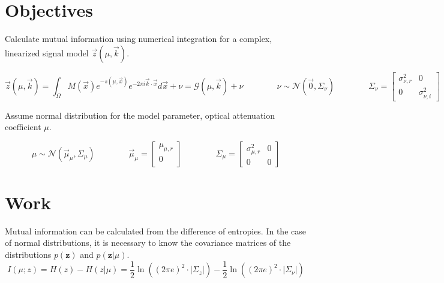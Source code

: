 \documentclass{article}         %
\theoremstyle{definition}
\theoremstyle{remark}
\begin{document}

\section{Objectives}\label{Objectives}

Calculate mutual information using numerical integration for a complex, linearized signal model $\vec{z}\left(\mu,\vec{k}\right)$.

\begin{equation}
	\vec{z}\left(\mu,\vec{k}\right) = \int_\Omega M\left(\vec{x}\right) e^{-s\left(\mu ,\vec{x}\right)}e^{-2\pi i\vec{k}\cdot\vec{x}}d\vec{x}+\nu=\mathcal{G}\left(\mu,\vec{k}\right)+\nu
	\qquad\qquad \nu\sim\mathcal{N}\left(\vec{0},\Sigma_\nu\right)
	\qquad\qquad \Sigma_\nu = \left[ \begin{array}{cc} 
		\sigma_{\nu,r}^2 & 0 \\
		0 & \sigma_{\nu,i}^2 \end{array} \right]
\end{equation}

Assume normal distribution for the model parameter, optical attenuation coefficient $\mu$.

\begin{equation}
	\mu\sim\mathcal{N}\left(\vec{\mu}_\mu,\Sigma_\mu\right)
	\qquad\qquad \vec{\mu}_\mu=\left[ \begin{array}{c}
		\mu_{\mu,r} \\ 0 \\ \end{array} \right]
	\qquad\qquad \Sigma_\mu=\left[\begin{array}{cc}
		\sigma_{\mu,r}^2 & 0 \\
		0 & 0 \end{array} \right]
\end{equation}

\section{Work}\label{Work}

Mutual information can be calculated from the difference of entropies. In the case of normal distributions, it is necessary to know the covariance matrices of the distributions $p\left(\mathbf{z}\right)$ and $p\left(\mathbf{z}|\mu\right)$.
\begin{equation}
	I\left(\mu;z\right) = H\left(z\right) - H\left(z|\mu\right) 
	= \frac{1}{2}\ln\left(\left(2\pi e\right)^2\cdot\lvert\Sigma_z\rvert\right) - \frac{1}{2}\ln\left(\left(2\pi e\right)^2\cdot\lvert\Sigma_\nu\rvert\right)
\end{equation}
\end{document}
